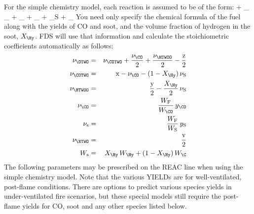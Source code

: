 \documentclass[11pt]{book}
\begin{document}
For the simple chemistry model, each reaction is assumed to be of the form:
\be {} + \nu_{\OTWO} \;  \rightarrow
    \nu_{\COTWO} \;  + \nu_{\HTWOO} \;  +
    \nu_{\CO}   \;    + \nu_{\rm S} \;  + \nu_{\NTWO} \;  \ee
You need only specify the chemical formula of the fuel along with the yields of CO and soot, and the volume fraction of hydrogen in the soot, $X_\Hy$. FDS will use that information and calculate the stoichiometric coefficients automatically as follows:
\begin{eqnarray*}
\nu_{\OTWO}    &=& \nu_{\COTWO} + \frac{\nu_{\CO}}{2} + \frac{\nu_{\HTWOO}}{2} - \frac{\hbox{z}}{2}   \\
\nu_{\COTWO}   &=& \hbox{x} - \nu_{\CO} - (1-X_\Hy) \, \nu_{\rm S} \\
\nu_{\HTWOO}   &=& \frac{\hbox{y}}{2} - \frac{X_\Hy}{2} \, \nu_{\rm S} \\
\nu_{\CO}      &=& \frac{W_{\rm F}}{W_{\CO}} \, y_{\CO}  \\
\nu_{\rm s}          &=& \frac{W_{\rm F}}{W_{\rm S}} \, y_{\rm S}  \\
\nu_{\NTWO}    &=& \frac{\rm v}{2}  \\
W_{\rm s}            &=& X_\Hy \, W_\Hy + (1-X_\Hy) \, W_\C
\end{eqnarray*}
The following parameters may be prescribed on the {\ct REAC} line when using the simple chemistry model.
Note that the various {\ct YIELD}s are for well-ventilated, post-flame conditions. There are options to
predict various species yields in under-ventilated fire scenarios, but these special models still require
the post-flame yields for CO, soot and any other species listed below.
\end{document}

